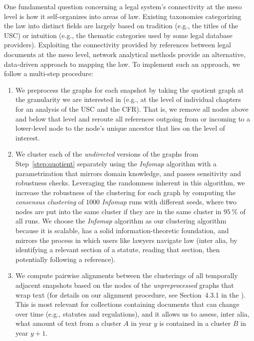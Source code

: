 One fundamental question concerning a legal system's connectivity at the meso level is how it self-organizes into areas of law.
Existing taxonomies categorizing the law into distinct fields are largely based on tradition (e.g., the titles of the USC) or intuition (e.g., the thematic categories used by some legal database providers). 
Exploiting the connectivity provided by references between legal documents at the meso level, network analytical methods provide an alternative, data-driven approach to mapping the law.
To implement such an approach, 
we follow a multi-step procedure:
\begin{enumerate}
	\item We preprocess the graphs for each snapshot by taking the quotient graph at the granularity we are interested in (e.g., at the level of individual chapters for an analysis of the USC and the CFR).
	That is, we remove all nodes above and below that level and reroute all references outgoing from or incoming to a lower-level node to the node's unique ancestor that lies on the level of interest.\label{step:quotient} 
	\item We cluster each of the \emph{undirected} versions of the graphs from Step~\ref{step:quotient} separately using the \emph{Infomap} algorithm \cite{rosvall2008,rosvall2009} with a parametrization that mirrors domain knowledge, and passes sensitivity and robustness checks. 
	Leveraging the randomness inherent in this algorithm, we increase the robustness of the clustering for each graph by computing the \emph{consensus clustering} \cite{lancichinetti2012} of $1000$ \emph{Infomap} runs with different seeds, where two nodes are put into the same cluster if they are in the same cluster in $95~\%$ of all runs.
	We choose the \emph{Infomap} algorithm as our clustering algorithm because it is scalable, has a solid information-theoretic foundation, and mirrors the process in which users like lawyers navigate law (inter alia, by identifying a relevant section of a statute, reading that section, then potentially following a reference).\label{step:clustering} 
	\item We compute pairwise alignments between the clusterings of all temporally adjacent snapshots based on the nodes of the \emph{unpreprocessed} graphs that wrap text (for details on our alignment procedure, see Section~4.3.1 in the \thesi).
	This is most relevant for collections containing documents that can change over time (e.g., statutes and regulations), and it allows us to assess, inter alia, what amount of text from a cluster $A$ in year $y$ is contained in a cluster $B$ in year $y+1$.\label{step:alignment}   

\end{enumerate}
